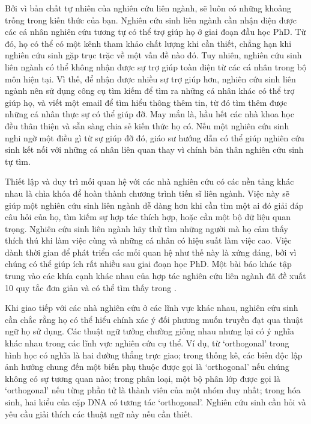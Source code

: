 \documentclass[12pt]{report}
\begin{document}
Bởi vì bản chất tự nhiên của nghiên cứu liên ngành, sẽ luôn có những khoảng trống trong kiến thức của bạn. Nghiên cứu sinh liên ngành cần nhận diện được các cá nhân nghiên cứu tương tự có thể trợ giúp họ ở giai đoạn đầu học PhD. Từ đó, họ có thể có một kênh tham khảo chất lượng khi cần thiết, chẳng hạn khi nghiên cứu sinh gặp trục trặc về một vấn đề nào đó. Tuy nhiên, nghiên cứu sinh liên ngành có thể không nhận được sự trợ giúp toàn diện từ các cá nhân trong bộ môn hiện tại. Vì thế, để nhận được nhiều sự trợ giúp hơn, nghiên cứu sinh liên ngành nên sử dụng công cụ tìm kiếm để tìm ra những cá nhân khác có thể trợ giúp họ, và viết một email để tìm hiểu thông thêm tin, từ đó tìm thêm được những cá nhân thực sự có thể giúp đỡ. May mắn là, hầu hết các nhà khoa học đều thân thiện và sẵn sàng chia sẻ kiến thức họ có. Nếu một nghiên cứu sinh nghi ngờ một điều gì từ sự giúp đỡ đó, giáo sư hướng dẫn có thể giúp nghiên cứu sinh kết nối với những cá nhân liên quan thay vì chính bản thân nghiên cứu sinh tự tìm.

Thiết lập và duy trì mối quan hệ với các nhà nghiên cứu có các nền tảng khác nhau là chìa khóa để hoàn thành chương trình tiến sĩ liên ngành. Việc này sẽ giúp một nghiên cứu sinh liên ngành dễ dàng hơn khi cần tìm một ai đó giải đáp câu hỏi của họ, tìm kiếm sự hợp tác thích hợp, hoặc cần một bộ dữ liệu quan trọng. Nghiên cứu sinh liên ngành hãy thử tìm những người mà họ cảm thấy thích thú khi làm việc cùng và những cá nhân có hiệu suất làm việc cao. Việc dành thời gian để phát triển các mối quan hệ như thế này là xứng đáng, bởi vì chúng có thể giúp ích rất nhiều sau giai đoạn học PhD. Một bài báo khác tập trung vào các khía cạnh khác nhau của hợp tác nghiên cứu liên ngành đã đề xuất 10 quy tắc đơn giản và có thể tìm thấy trong \cite{10}.

Khi giao tiếp với các nhà nghiên cứu ở các lĩnh vực khác nhau, nghiên cứu sinh cần chắc rằng họ có thể hiểu chính xác ý đối phương muốn truyền đạt qua thuật ngữ họ sử dụng. Các thuật ngữ tưởng chường giống nhau nhưng lại có ý nghĩa khác nhau trong các lĩnh vực nghiên cứu cụ thể. Ví dụ, từ ‘orthogonal’ trong hình học có nghĩa là hai đường thẳng trực giao; trong thống kê, các biến độc lập ảnh hưởng chung đến một biến phụ thuộc được gọi là ‘orthogonal’ nếu chúng không có sự tương quan nào; trong phân loại, một bộ phân lớp được gọi là ‘orthogonal’ nếu từng phần tử là thành viên của một nhóm duy nhất; trong hóa sinh, hai kiểu của cặp DNA có tương tác ‘orthogonal’. Nghiên cứu sinh cần hỏi và yêu cầu giải thích các thuật ngữ này nếu cần thiết.
\end{document}
